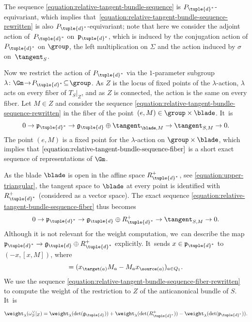 The sequence \eqref{equation:relative-tangent-bundle-sequence}
is $P_{\tuple{d}^*}$-equivariant, which implies that~\eqref{equation:relative-tangent-bundle-sequence-rewritten} is also $P_{\tuple{d}^*}$\nobreakdash-equi\-variant;
note that here we consider the adjoint action of~$P_{\tuple{d}^*}$ on~$\mathfrak{p}_{\tuple{d}^*}$, which is induced by the conjugation action of $P_{\tuple{d}^*}$ on $\group$, the left multiplication on $\Sigma$ and the action induced by $\sigma$ on~$\tangent_{S}$.

Now we restrict the action of $P_{\tuple{d}^*}$ via the $1$-parameter subgroup $\lambda\colon \Gm\!\to\! P_{\tuple{d}^*} \!\subseteq\! \group$.
As $Z$ is the locus of fixed points of the $\lambda$-action,
$\lambda$ acts on every fiber of $T_S|_Z$,
and as $Z$ is connected, the action is the same on every fiber.
Let $M \in Z$ and consider the sequence \eqref{equation:relative-tangent-bundle-sequence-rewritten}
in the fiber of the point~$(e,M) \in \group \times \blade$. It~is
\begin{equation}
\label{equation:relative-tangent-bundle-sequence-fiber}
0
\to\mathfrak{p}_{\tuple{d}^*}
\to\mathfrak{g}_{\tuple{d}} \oplus \tangent_{\blade,M}
\to\tangent_{S,M}
\to0.
\end{equation}
The point $(e,M)$ is a fixed point for the $\lambda$-action on $\group \times \blade$,
which implies that $\eqref{equation:relative-tangent-bundle-sequence-fiber}$ is a short exact sequence of representations of $\Gm$.

As the blade $\blade$ is open in the affine space $R_{\tuple{d}^*}^+$, see \eqref{equation:upper-triangular},
the tangent space to $\blade$ at every point is identified
with $R_{\tuple{d}^*}^+$ (considered as a vector space).
The exact sequence \eqref{equation:relative-tangent-bundle-sequence-fiber} thus becomes
\begin{equation}
\label{equation:relative-tangent-bundle-sequence-fiber-rewritten}
0
\to\mathfrak{p}_{\tuple{d}^*}
\to\mathfrak{g}_{\tuple{d}} \oplus R_{\tuple{d}^*}^+
\to\tangent_{S,M}
\to0.
\end{equation}
Although it is not relevant for the weight computation, we~can describe the map $\mathfrak{p}_{\tuple{d}^*} \to \mathfrak{g}_{\tuple{d}} \oplus R_{\tuple{d}^*}^+$ explicitly. It~sends $x \in \mathfrak{p}_{\tuple{d}^*}$ to $(-x, [x,M])$, where
\begin{equation*}
[x,M] = (x_{\target(a)}M_a - M_ax_{\source(a)})_{a \in Q_1}.
\end{equation*}
We use the sequence \eqref{equation:relative-tangent-bundle-sequence-fiber-rewritten}
to compute the weight of the restriction to $Z$ of the anticanonical bundle of $S$. It~is
\begin{equation}
\label{equation:split-computation}
\weight_{\lambda}(\omega_S^\vee|_Z) = \weight_{\lambda}(\det(\mathfrak{g}_{\tuple{d}})) + \weight_{\lambda}(\det(R_{\tuple{d}^*}^+)) - \weight_{\lambda}(\det(\mathfrak{p}_{\tuple{d}^*})).
\end{equation}

